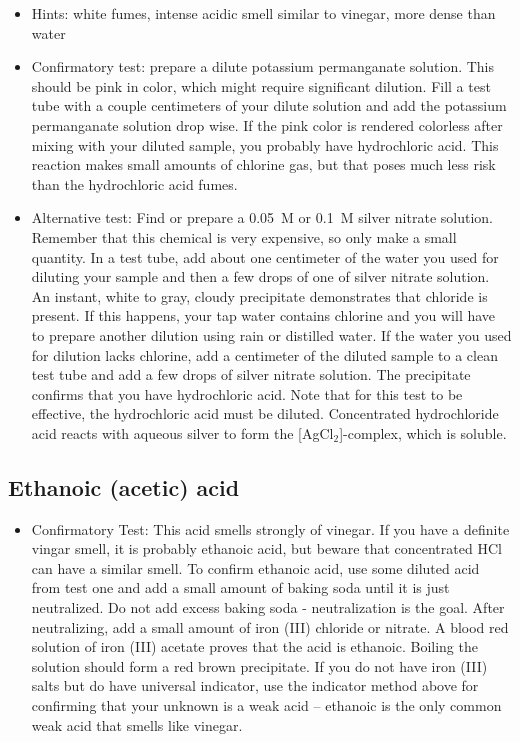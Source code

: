 \begin{itemize}

\item{Hints: white fumes, 
intense acidic smell similar to vinegar, 
more dense than water}

\item{Confirmatory test: 
prepare a dilute potassium permanganate solution. 
This should be pink in color, 
which might require significant dilution. 
Fill a test tube with a couple centimeters of your dilute solution 
and add the potassium permanganate solution drop wise. 
If the pink color is rendered colorless 
after mixing with your diluted sample, 
you probably have hydrochloric acid. 
This reaction makes small amounts of chlorine gas, 
but that poses much less risk than the hydrochloric acid fumes.}

\item{Alternative test: 
Find or prepare a 0.05~M or 0.1~M silver nitrate solution. 
Remember that this chemical is very expensive, 
so only make a small quantity. 
In a test tube, 
add about one centimeter of the water you used 
for diluting your sample 
and then a few drops of one of silver nitrate solution. 
An instant, 
white to gray, 
cloudy precipitate demonstrates that chloride is present. 
If this happens, 
your tap water contains chlorine 
and you will have to prepare another dilution 
using rain or distilled water. 
If the water you used for dilution lacks chlorine, 
add a centimeter of the diluted sample 
to a clean test tube and add a few drops of silver nitrate solution. 
The precipitate confirms that you have hydrochloric acid. 
Note that for this test to be effective, 
the hydrochloric acid must be diluted. 
Concentrated hydrochloride acid reacts with aqueous silver 
to form the [AgCl$_{2}$]-complex, 
which is soluble.}

\end{itemize}

\subsection{Ethanoic (acetic) acid}

\begin{itemize}

\item{Confirmatory Test: This acid smells strongly of vinegar. 
If you have a definite vingar smell, 
it is probably ethanoic acid, 
but beware that concentrated HCl can have a similar smell. 
To confirm ethanoic acid, 
use some diluted acid from test one 
and add a small amount of baking soda until it is just neutralized. 
Do not add excess baking soda - neutralization is the goal. 
After neutralizing, 
add a small amount of iron (III) chloride or nitrate. 
A blood red solution of iron (III) acetate 
proves that the acid is ethanoic. 
Boiling the solution should form a red brown precipitate. 
If you do not have iron (III) salts but do have universal indicator, 
use the indicator method above 
for confirming that your unknown is a weak acid -- 
ethanoic is the only common weak acid that smells like vinegar.} 
\end{itemize}


